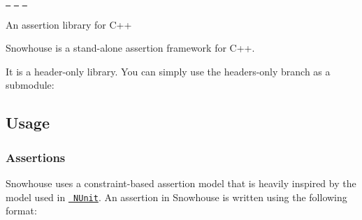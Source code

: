 \href{https://travis-ci.org/banditcpp/snowhouse}{\texttt{ }} \href{https://ci.appveyor.com/project/banditcpp/snowhouse}{\texttt{ }} \href{https://www.codacy.com/app/sbeyer/snowhouse?utm_source=github.com&amp;utm_medium=referral&amp;utm_content=banditcpp/snowhouse&amp;utm_campaign=Badge_Grade}{\texttt{ }}

An assertion library for C++

Snowhouse is a stand-\/alone assertion framework for C++.

It is a header-\/only library. You can simply use the {\ttfamily headers-\/only} branch as a submodule\+:


\begin{DoxyCode}{0}
\end{DoxyCode}


\subsection*{Usage}


\begin{DoxyCode}{0}
\DoxyCodeLine{}
\DoxyCodeLine{}
\DoxyCodeLine{\{}
\DoxyCodeLine{}
\DoxyCodeLine{  \{}
\DoxyCodeLine{  \}}
\DoxyCodeLine{  \{}
\DoxyCodeLine{  \}}
\DoxyCodeLine{}
\DoxyCodeLine{\}}
\end{DoxyCode}


\subsubsection*{Assertions}

Snowhouse uses a constraint-\/based assertion model that is heavily inspired by the model used in \href{http://nunit.org/}{\texttt{ N\+Unit}}. An assertion in Snowhouse is written using the following format\+:


\begin{DoxyCode}{0}
\end{DoxyCode}


